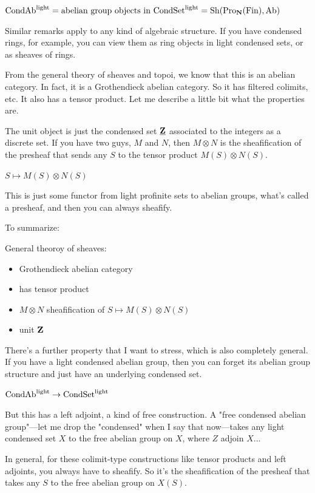 $\mathrm{Cond}\mathrm{Ab}^{\mathrm{light}} = \text{abelian group objects in $\mathrm{Cond}\mathrm{Set}^{\mathrm{light}}$} = \operatorname{Sh}(\operatorname{Pro}_\mathbf N(\operatorname{Fin}),\mathrm{Ab})$ 

Similar remarks apply to any kind of algebraic structure. If you have condensed rings, for example, you can view them as ring objects in light condensed sets, or as sheaves of rings.

From the general theory of sheaves and topoi, we know that this is an abelian category. In fact, it is a Grothendieck abelian category. So it has filtered colimits, etc.  
It also has a tensor product. Let me describe a little bit what the properties are.

The unit object is just the condensed set $\underline{\mathbf Z}$ associated to the integers as a discrete set. If you have two guys, $M$ and $N$, then $M \otimes N$ is the sheafification of the presheaf that sends any $S$ to the tensor product $M(S) \otimes N(S)$. 

$S \mapsto M(S)\otimes N(S)$

This is just some functor from light profinite sets to abelian groups, what's called a presheaf, and then you can always sheafify.

To summarize:

General theoroy of sheaves:
\begin{itemize}
\item Grothendieck abelian category
\item has tensor product 
\item $M \otimes N$ sheafification of $S \mapsto M(S)\otimes N(S)$
\item unit $\mathbf Z$ %
\end{itemize}

There's a further property that I want to stress, which is also completely general. If you have a light condensed abelian group, then you can forget its abelian group structure and just have an underlying condensed set. 

$\mathrm{Cond}\mathrm{Ab}^{\mathrm{light}} \to \mathrm{Cond}\mathrm{Set}^{\mathrm{light}}$

But this has a left adjoint, a kind of free construction. A "free condensed abelian group"---let me drop the "condensed" when I say that now---takes any light condensed set $X$ to the free abelian group on $X$, where $Z$ adjoin $X$...

In general, for these colimit-type constructions like tensor products and left adjoints, you always have to sheafify. So it's the sheafification of the presheaf that takes any $S$ to the free abelian group on $X(S)$.

